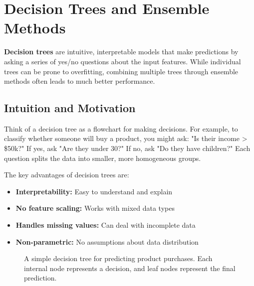 
\section{Decision Trees and Ensemble Methods}
\label{sec:decision-trees}

\textbf{Decision trees} are intuitive, interpretable models that make predictions by asking a series of yes/no questions about the input features. While individual trees can be prone to overfitting, combining multiple trees through ensemble methods often leads to much better performance.

\subsection{Intuition and Motivation}

Think of a decision tree as a flowchart for making decisions. For example, to classify whether someone will buy a product, you might ask: "Is their income > \$50k?" If yes, ask "Are they under 30?" If no, ask "Do they have children?" Each question splits the data into smaller, more homogeneous groups.

The key advantages of decision trees are:
\begin{itemize}
    \item \textbf{Interpretability:} Easy to understand and explain
    \item \textbf{No feature scaling:} Works with mixed data types
    \item \textbf{Handles missing values:} Can deal with incomplete data
    \item \textbf{Non-parametric:} No assumptions about data distribution
\end{itemize}

\begin{figure}[htbp]
\centering
{}
\caption{A simple decision tree for predicting product purchases. Each internal node represents a decision, and leaf nodes represent the final prediction.}
\label{fig:decision-tree-example}
\end{figure}

